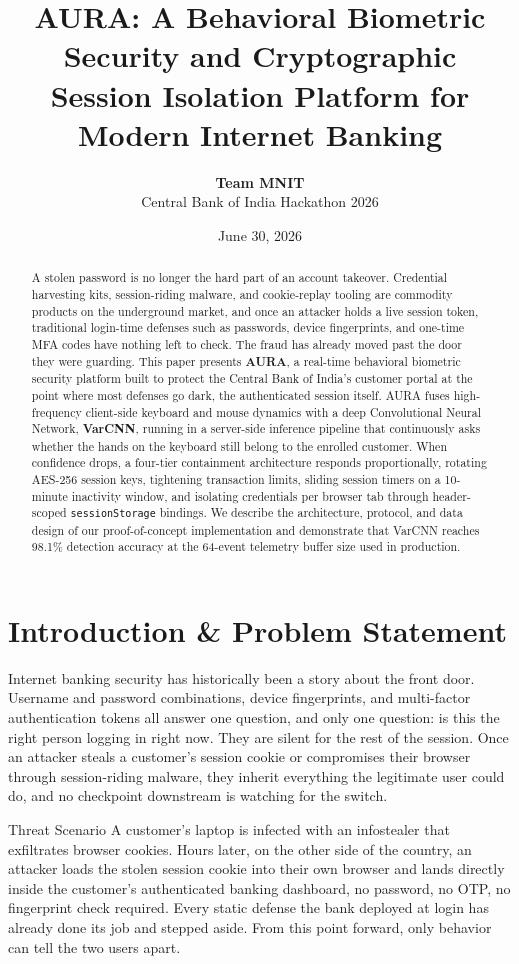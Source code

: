 \documentclass[11pt,journal,onecolumn]{article}
\title{\textbf{AURA: A Behavioral Biometric Security and Cryptographic Session Isolation Platform for Modern Internet Banking}}
\author{\textbf{Team MNIT} \\ Central Bank of India Hackathon 2026}
\date{June 30, 2026}
\begin{document}
\maketitle

\begin{abstract}
A stolen password is no longer the hard part of an account takeover. Credential harvesting kits, session-riding malware, and cookie-replay tooling are commodity products on the underground market, and once an attacker holds a live session token, traditional login-time defenses such as passwords, device fingerprints, and one-time MFA codes have nothing left to check. The fraud has already moved past the door they were guarding. This paper presents \textbf{AURA}, a real-time behavioral biometric security platform built to protect the Central Bank of India's customer portal at the point where most defenses go dark, the authenticated session itself. AURA fuses high-frequency client-side keyboard and mouse dynamics with a deep Convolutional Neural Network, \textbf{VarCNN}, running in a server-side inference pipeline that continuously asks whether the hands on the keyboard still belong to the enrolled customer. When confidence drops, a four-tier containment architecture responds proportionally, rotating AES-256 session keys, tightening transaction limits, sliding session timers on a 10-minute inactivity window, and isolating credentials per browser tab through header-scoped \texttt{sessionStorage} bindings. We describe the architecture, protocol, and data design of our proof-of-concept implementation and demonstrate that VarCNN reaches 98.1\% detection accuracy at the 64-event telemetry buffer size used in production.
\end{abstract}

\section{Introduction \& Problem Statement}
Internet banking security has historically been a story about the front door. Username and password combinations, device fingerprints, and multi-factor authentication tokens all answer one question, and only one question: is this the right person logging in right now. They are silent for the rest of the session. Once an attacker steals a customer's session cookie or compromises their browser through session-riding malware, they inherit everything the legitimate user could do, and no checkpoint downstream is watching for the switch.

\begin{threatbox}{Threat Scenario}
A customer's laptop is infected with an infostealer that exfiltrates browser cookies. Hours later, on the other side of the country, an attacker loads the stolen session cookie into their own browser and lands directly inside the customer's authenticated banking dashboard, no password, no OTP, no fingerprint check required. Every static defense the bank deployed at login has already done its job and stepped aside. From this point forward, only behavior can tell the two users apart.
\end{threatbox}
\end{document}
